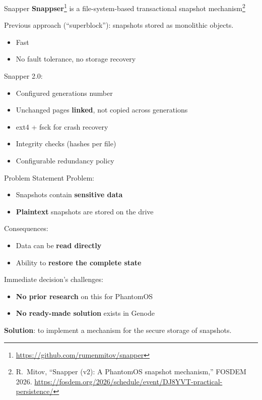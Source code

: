 \documentclass{beamer}
\begin{document}

\begin{frame}{Snapper}
    \textbf{Snappser}\footnote{\url{https://github.com/rumenmitov/snapper}} is a file-system-based transactional snapshot mechanism\footnote{R.~Mitov, ``Snapper (v2): A PhantomOS snapshot mechanism,'' FOSDEM 2026. \url{https://fosdem.org/2026/schedule/event/DJ8YVT-practical-persistence/}}

    \bigskip
    Previous approach (``superblock''): snapshots stored as monolithic objects.
    \begin{itemize}
        \item[$+$] Fast
        \item[$-$] No fault tolerance, no storage recovery
    \end{itemize}

    \bigskip
    Snapper 2.0:
    \begin{itemize}
        \item Configured generations number
        \item Unchanged pages \textbf{linked}, not copied across generations
        \item ext4 + fsck for crash recovery
        \item Integrity checks (hashes per file)
        \item Configurable redundancy policy
    \end{itemize}
\end{frame}


\begin{frame}{Problem Statement}
    Problem:
    \begin{itemize}
        \item Snapshots contain \textbf{sensitive data}
        \item \textbf{Plaintext} snapshots are stored on the drive
    \end{itemize}
    \bigskip
    
    Consequences:
    \begin{itemize}
        \item Data can be \textbf{read directly}
        \item Ability to \textbf{restore the complete state}
    \end{itemize}
    \bigskip

    Immediate decision's challenges:
    \begin{itemize}
        \item \textbf{No prior research} on this for PhantomOS
        \item \textbf{No ready-made solution} exists in Genode
    \end{itemize}

    \bigskip
    \textbf{Solution}: to implement a mechanism for the secure storage of snapshots.
\end{frame}
\end{document}
